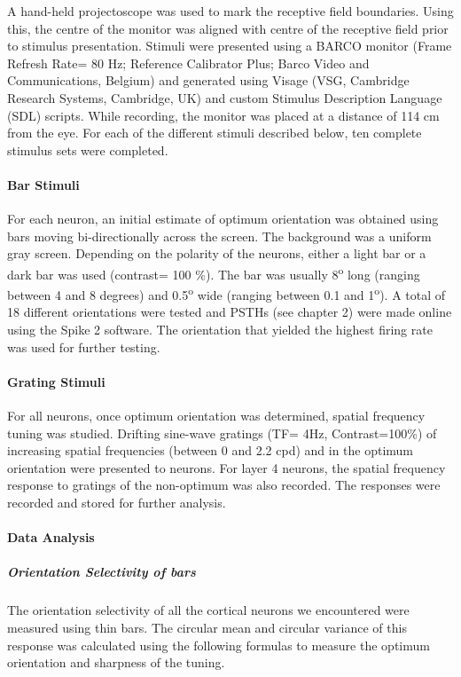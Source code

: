 A hand-held projectoscope was used to mark the receptive field
boundaries. Using this, the centre of the monitor was aligned with
centre of the receptive field prior to stimulus presentation. Stimuli
were presented using a BARCO monitor (Frame Refresh Rate= 80 Hz;
Reference Calibrator Plus; Barco Video and Communications, Belgium) and
generated using Visage (VSG, Cambridge Research Systems, Cambridge, UK)
and custom Stimulus Description Language (SDL) scripts. While recording,
the monitor was placed at a distance of 114 cm from the eye. For each of
the different stimuli described below, ten complete stimulus sets were
completed.


\paragraph{Bar Stimuli}

For each neuron, an initial estimate of optimum orientation was obtained
using bars moving bi-directionally across the screen. The background was
a uniform gray screen. Depending on the polarity of the neurons, either
a light bar or a dark bar was used (contrast= 100 \%). The bar was
usually 8\textsuperscript{o} long (ranging between 4 and 8 degrees) and
0.5\textsuperscript{o} wide (ranging between 0.1 and
1\textsuperscript{o}). A total of 18 different orientations were tested
and PSTHs (see chapter 2) were made online using the Spike 2 software.
The orientation that yielded the highest firing rate was used for
further testing.


\paragraph{Grating Stimuli}

For all neurons, once optimum orientation was determined, spatial
frequency tuning was studied. Drifting sine-wave gratings (TF= 4Hz,
Contrast=100\%) of increasing spatial frequencies (between 0 and 2.2
cpd) and in the optimum orientation were presented to neurons. For layer
4 neurons, the spatial frequency response to gratings of the non-optimum
was also recorded. The responses were recorded and stored for further
analysis.

\paragraph{Data Analysis}

\subparagraph{Orientation Selectivity of bars}

The orientation selectivity of all the cortical neurons we encountered
were measured using thin bars. The circular mean and circular variance
of this response was calculated using the following formulas to measure
the optimum orientation and sharpness of the tuning.

